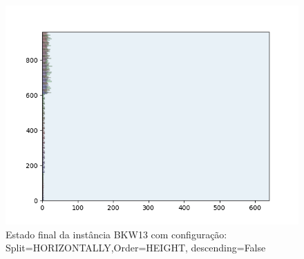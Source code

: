\begin{figure}[H]
    \centering
    \caption[]{Estado final da instância BKW13 com configuração: Split=HORIZONTALLY,Order=HEIGHT, descending=False}
    \label{fig:bkw13-horizontally-height-false}
    \includegraphics[scale=0.5]{output/figures/bkw/bkw13/horizontally/height/false/0000}
\end{figure}